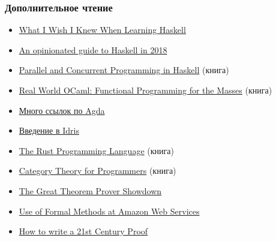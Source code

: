 \documentclass[11pt]{beamer}
\begin{document}
\begin{frame}[fragile]
\frametitle{Дополнительное чтение}
\begin{itemize}
    \item \href{http://dev.stephendiehl.com/hask/}{ What I Wish I Knew When Learning Haskell}
    \item \href{https://lexi-lambda.github.io/blog/2018/02/10/an-opinionated-guide-to-haskell-in-2018/}{An opinionated guide to Haskell in 2018}
    \item \href{https://simonmar.github.io/pages/pcph.html}{Parallel and Concurrent Programming in Haskell} (книга)
    \item \href{https://realworldocaml.org/}{Real World OCaml: Functional Programming for the Masses} (книга)
    \item \href{https://wiki.portal.chalmers.se/agda/pmwiki.php?n=Main.Documentation}{Много ссылок по Agda}
    \item \href{http://docs.idris-lang.org/en/latest/tutorial/index.html}{Введение в Idris}
    \item \href{https://doc.rust-lang.org/1.30.0/book/2018-edition/index.html}{The Rust Programming Language} (книга)
    \item \href{https://github.com/hmemcpy/milewski-ctfp-pdf}{Category Theory for Programmers} (книга)
    \item \href{https://www.hillelwayne.com/post/theorem-prover-showdown/}{The Great Theorem Prover Showdown}
    \item \href{https://blog.acolyer.org/2014/11/24/use-of-formal-methods-at-amazon-web-services/}{Use of Formal Methods at Amazon Web Services}
    \item \href{https://blog.acolyer.org/2015/01/12/how-to-write-a-21st-century-proof/}{How to write a 21st Century Proof}
\end{itemize}
\end{frame}
\end{document}
